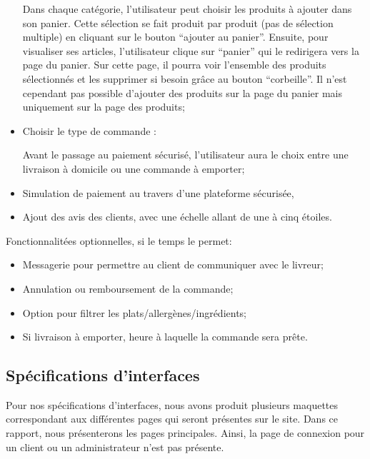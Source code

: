 \begin{itemize}
    Dans chaque catégorie, l’utilisateur peut choisir les produits à ajouter dans son panier. Cette sélection se fait produit par produit (pas de sélection multiple) en cliquant sur le bouton “ajouter au panier”. Ensuite, pour visualiser ses articles, l'utilisateur clique sur “panier” qui le redirigera vers la page du panier. Sur cette page, il pourra voir l’ensemble des produits sélectionnés et les supprimer si besoin grâce au bouton “corbeille”. Il n’est cependant pas possible d’ajouter des produits sur la page du panier mais uniquement sur la page des produits;

    \item Choisir le type de commande :
    
    Avant le passage au paiement sécurisé, l’utilisateur aura le choix entre une livraison à domicile ou une commande à emporter;
    
    \item Simulation de paiement au travers d'une plateforme sécurisée,
    
    \item Ajout des avis des clients, avec une échelle allant de une à cinq étoiles.
\end{itemize}

\vspace{10pt}

Fonctionnalitées optionnelles, si le temps le permet:
\begin{itemize}    
    \item Messagerie pour permettre au client de communiquer avec le livreur;
    \item Annulation ou remboursement de la commande;
    \item Option pour filtrer les plats/allergènes/ingrédients;
    \item Si livraison à emporter, heure à laquelle la commande sera prête.
\end{itemize}

\subsection{Spécifications d'interfaces}
Pour nos spécifications d'interfaces, nous avons produit plusieurs maquettes correspondant aux différentes pages qui seront présentes sur le site. Dans ce rapport, nous présenterons les pages principales. Ainsi, la page de connexion pour un client ou un administrateur n'est pas présente.

\clearpage

